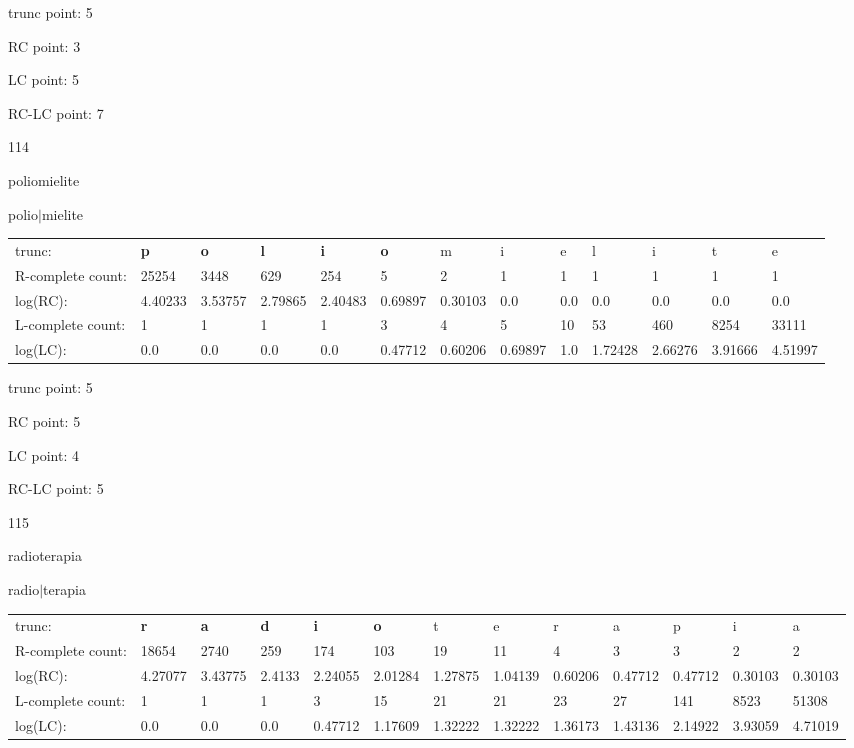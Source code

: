 \documentclass{article}
\begin{document}
trunc point: 5

RC point: 3

LC point: 5

RC-LC point: 7

\vspace{3em}



114

poliomielite

polio$|$mielite

\vspace{1em}

\begin{tabular}{l|llllllllllll}

trunc: & {\color{red}\bf p} & {\color{red}\bf o} & {\color{red}\bf l} & {\color{red}\bf i} & {\color{red}\bf o} & m & i & e & l & i & t & e \\ 
R-complete count: & 25254 & 3448 & 629 & 254 & 5 & 2 & 1 & 1 & 1 & 1 & 1 & 1 \\ 
log(RC): & 4.40233 & 3.53757 & 2.79865 & 2.40483 & 0.69897 & 0.30103 & 0.0 & 0.0 & 0.0 & 0.0 & 0.0 & 0.0 \\ 
L-complete count: & 1 & 1 & 1 & 1 & 3 & 4 & 5 & 10 & 53 & 460 & 8254 & 33111 \\ 
log(LC): & 0.0 & 0.0 & 0.0 & 0.0 & 0.47712 & 0.60206 & 0.69897 & 1.0 & 1.72428 & 2.66276 & 3.91666 & 4.51997 \\ 
\end{tabular}

trunc point: 5

RC point: 5

LC point: 4

RC-LC point: 5

\vspace{3em}



115

radioterapia

radio$|$terapia

\vspace{1em}

\begin{tabular}{l|llllllllllll}

trunc: & {\color{red}\bf r} & {\color{red}\bf a} & {\color{red}\bf d} & {\color{red}\bf i} & {\color{red}\bf o} & t & e & r & a & p & i & a \\ 
R-complete count: & 18654 & 2740 & 259 & 174 & 103 & 19 & 11 & 4 & 3 & 3 & 2 & 2 \\ 
log(RC): & 4.27077 & 3.43775 & 2.4133 & 2.24055 & 2.01284 & 1.27875 & 1.04139 & 0.60206 & 0.47712 & 0.47712 & 0.30103 & 0.30103 \\ 
L-complete count: & 1 & 1 & 1 & 3 & 15 & 21 & 21 & 23 & 27 & 141 & 8523 & 51308 \\ 
log(LC): & 0.0 & 0.0 & 0.0 & 0.47712 & 1.17609 & 1.32222 & 1.32222 & 1.36173 & 1.43136 & 2.14922 & 3.93059 & 4.71019 \\ 
\end{tabular}
\end{document}
